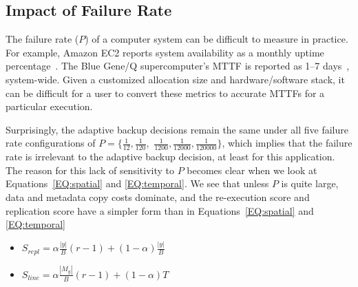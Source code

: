 \documentclass{sig-alternate}
\newcommand{\iannote}[1]{ {\textcolor{red}    { ***Ian:      #1 }}}
\newcommand{\katznote}[1]{ {\textcolor{blue}    { ***Dan:      #1 }}}
\newcommand{\zhaonote}[1]{{\textcolor{cyan}    { ***Zhao:      #1 }}}
\newcommand{\kylenote}[1]{{\textcolor{orange}    { ***Kyle:      #1 }}}
\newcommand{\iannote}[1]{}
\newcommand{\katznote}[1]{}
\newcommand{\zhaonote}[1]{}
\newcommand{\kylenote}[1]{}
\begin{document}
\subsection{Impact of Failure Rate}
\label{sec:Perf:Failure}
The failure rate ($P$) of a computer system can be difficult to measure in practice.
For example, Amazon EC2 reports  system availability as a monthly uptime percentage~\cite{AWS-SLA}.
The Blue Gene/Q supercomputer's MTTF is reported as 1--7 days~\cite{Snir-resilience}, system-wide.
Given a customized allocation size
and hardware/software stack, it can be difficult for a user to convert these metrics to accurate MTTFs for a particular execution.

Surprisingly, the adaptive backup decisions remain the same under all five failure rate configurations of $P=\{\frac{1}{12}, \frac{1}{120},$ 
$\frac{1}{1200}, \frac{1}{12000}, \frac{1}{120000}\}$,
which implies that the failure rate is irrelevant to the adaptive backup decision, at least for this application.
The reason for this lack of sensitivity to $P$ becomes clear when we look at Equations~\ref{EQ:spatial} and \ref{EQ:temporal}.
We see that unless $P$ is quite large, data and metadata copy costs dominate,
%
and the re-execution score and replication score have a simpler form than in Equations~\ref{EQ:spatial} and \ref{EQ:temporal}
\begin{itemize}
  \item[] $S_{repl} = \alpha\frac{|y|}{B}(r-1) + (1-\alpha)\frac{|y|}{B} $
  \item[] $S_{line} = \alpha\frac{|M_y|}{B}(r-1) + (1-\alpha)T$
\end{itemize}
\end{document}
